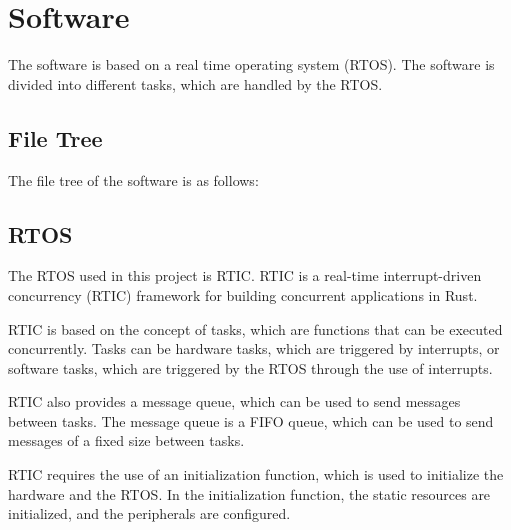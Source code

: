 \chapter{Software}\label{ch:system-development}
The software is based on a real time operating system (RTOS).
The software is divided into different tasks, which are handled by the RTOS.


\section{File Tree}
The file tree of the software is as follows:



\section{RTOS}
The RTOS used in this project is RTIC.%
RTIC is a real-time interrupt-driven concurrency (RTIC) framework for building concurrent applications in Rust.

RTIC is based on the concept of tasks, which are functions that can be executed concurrently.
Tasks can be hardware tasks, which are triggered by interrupts, or software tasks, which are triggered by the RTOS through the use of interrupts.

RTIC also provides a message queue, which can be used to send messages between tasks.
The message queue is a FIFO queue, which can be used to send messages of a fixed size between tasks.

RTIC requires the use of an initialization function, which is used to initialize the hardware and the RTOS.
In the initialization function, the static resources are initialized, and the peripherals are configured.


